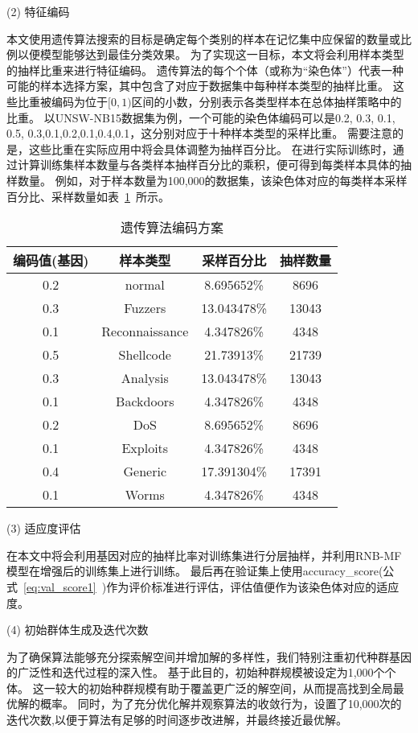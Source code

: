 (2) 特征编码\par
本文使用遗传算法搜索的目标是确定每个类别的样本在记忆集中应保留的数量或比例以便模型能够达到最佳分类效果。
为了实现这一目标，本文将会利用样本类型的抽样比重来进行特征编码。
遗传算法的每个个体（或称为“染色体”）代表一种可能的样本选择方案，其中包含了对应于数据集中每种样本类型的抽样比重。
这些比重被编码为位于$[0,1)$区间的小数，分别表示各类型样本在总体抽样策略中的比重。
以UNSW-NB15数据集为例，一个可能的染色体编码可以是{0.2, 0.3, 0.1, 0.5, 0.3,0.1,0.2,0.1,0.4,0.1}，这分别对应于十种样本类型的采样比重。
需要注意的是，这些比重在实际应用中将会具体调整为抽样百分比。
在进行实际训练时，通过计算训练集样本数量与各类样本抽样百分比的乘积，便可得到每类样本具体的抽样数量。
例如，对于样本数量为100,000的数据集，该染色体对应的每类样本采样百分比、采样数量如表~\ref{tab:Ga_code}~所示。\par

\begin{table}
  \caption{遗传算法编码方案}
  \label{tab:Ga_code}
  \centering
  \begin{tabular}{cccc}
    \toprule
    \textbf{编码值(基因)}&\textbf{样本类型}&\textbf{采样百分比}&\textbf{抽样数量}\\
    \midrule
    0.2&normal&8.695652\%&8696\\
    0.3&Fuzzers&13.043478\%&13043\\
    0.1&Reconnaissance&4.347826\%&4348\\
    0.5&Shellcode&21.73913\%&21739\\
    0.3&Analysis&13.043478\%&13043\\
    0.1&Backdoors&4.347826\%&4348\\
    0.2&DoS&8.695652\%&8696\\
    0.1&Exploits&4.347826\%&4348\\
    0.4&Generic&17.391304\%&17391\\
    0.1&Worms&4.347826\%&4348\\
    \bottomrule
  \end{tabular}
\end{table}

(3) 适应度评估\par
在本文中将会利用基因对应的抽样比率对训练集进行分层抽样，并利用RNB-MF模型在增强后的训练集上进行训练。
最后再在验证集上使用accuracy\_score(公式~\ref{eq:val_score1}~)作为评价标准进行评估，评估值便作为该染色体对应的适应度。\par

(4) 初始群体生成及迭代次数\par
为了确保算法能够充分探索解空间并增加解的多样性，我们特别注重初代种群基因的广泛性和迭代过程的深入性。
基于此目的，初始种群规模被设定为1,000个个体。
这一较大的初始种群规模有助于覆盖更广泛的解空间，从而提高找到全局最优解的概率。
同时，为了充分优化解并观察算法的收敛行为，设置了10,000次的迭代次数,以便于算法有足够的时间逐步改进解，并最终接近最优解。\par

